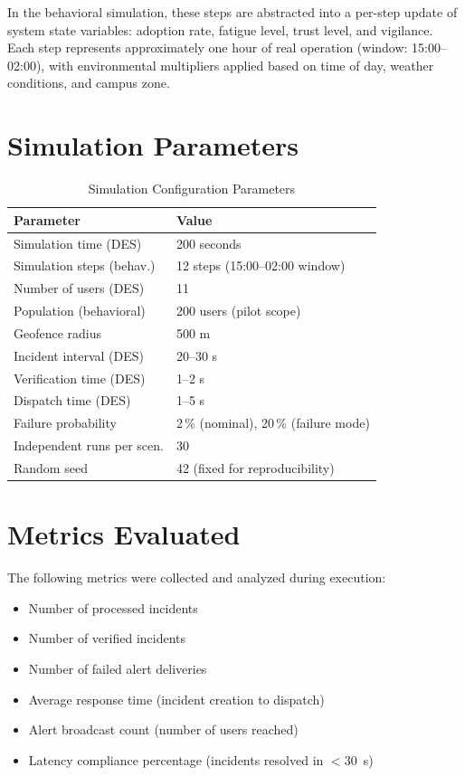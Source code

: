 \documentclass[conference,a4paper,10pt]{IEEEtran}
\begin{document}
In the behavioral simulation, these steps are abstracted into a
per-step update of system state variables: adoption rate, fatigue
level, trust level, and vigilance. Each step represents approximately
one hour of real operation (window: 15:00--02:00), with environmental
multipliers applied based on time of day, weather conditions, and
campus zone.

\section{Simulation Parameters}

\begin{table}[H]
\caption{Simulation Configuration Parameters}
\label{tab:params}\centering\small
\begin{tabular}{ll}
\toprule
\textbf{Parameter} & \textbf{Value}\\
\midrule
Simulation time (DES)       & 200 seconds\\
Simulation steps (behav.)   & 12 steps (15:00--02:00 window)\\
Number of users (DES)       & 11\\
Population (behavioral)     & 200 users (pilot scope)\\
Geofence radius             & 500 m\\
Incident interval (DES)     & 20--30 s\\
Verification time (DES)     & 1--2 s\\
Dispatch time (DES)         & 1--5 s\\
Failure probability         & 2\,\% (nominal), 20\,\% (failure mode)\\
Independent runs per scen.  & 30\\
Random seed                 & 42 (fixed for reproducibility)\\
\bottomrule
\end{tabular}
\end{table}

\section{Metrics Evaluated}

The following metrics were collected and analyzed during execution:

\begin{itemize}
  \item Number of processed incidents
  \item Number of verified incidents
  \item Number of failed alert deliveries
  \item Average response time (incident creation to dispatch)
  \item Alert broadcast count (number of users reached)
  \item Latency compliance percentage (incidents resolved in $< 30$~s)
\end{itemize}
\end{document}
